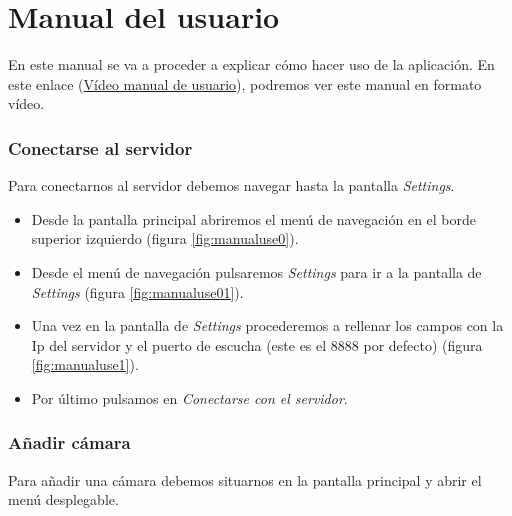 \section{Manual del usuario}

En este manual se va a proceder a explicar cómo hacer uso de la aplicación.
En este enlace (\href{https://youtu.be/txAF8uAJ6B0}{Vídeo manual de usuario}), podremos ver este manual en formato vídeo.

\subsubsection{Conectarse al servidor}

Para conectarnos al servidor debemos navegar hasta la pantalla \textit{Settings}.

\begin{itemize}
\item
	Desde la pantalla principal abriremos el menú de navegación en el borde superior izquierdo (figura \ref{fig:manualuse0}).
\item
	Desde el menú de navegación pulsaremos \textit{Settings} para ir a la pantalla de \textit{Settings} (figura \ref{fig:manualuse01}).
\item
	Una vez en la pantalla de \textit{Settings} procederemos a rellenar los campos con la Ip del servidor y el puerto de escucha (este es el 8888 por defecto) (figura \ref{fig:manualuse1}).
\item
	Por último pulsamos en \textit{Conectarse con el servidor}.
\end{itemize}

\subsubsection{Añadir cámara}

Para añadir una cámara debemos situarnos en la pantalla principal y abrir el menú desplegable.

